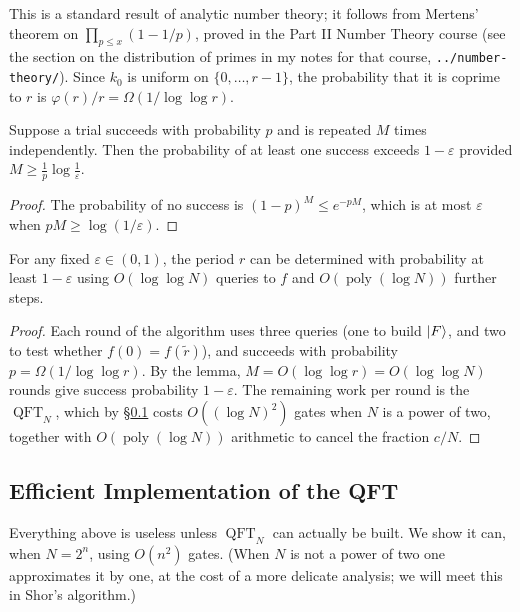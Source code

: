 \documentclass[a4paper]{scrartcl}
\newcommand{\QFT}{\operatorname{QFT}}
\DeclareMathOperator{\poly}{poly}
\begin{document}
This is a standard result of analytic number theory; it follows from Mertens' theorem on $\prod_{p\le x}(1-1/p)$, proved in the Part II Number Theory course (see the section on the distribution of primes in my notes for that course, \texttt{../number-theory/}). Since $k_0$ is uniform on $\{0,\dots,r-1\}$, the probability that it is coprime to $r$ is $\varphi(r)/r = \Omega(1/\log\log r)$.

\begin{lemma}
	Suppose a trial succeeds with probability $p$ and is repeated $M$ times independently. Then the probability of at least one success exceeds $1-\varepsilon$ provided $M\geq \frac{1}{p}\log\frac1\varepsilon$.
\end{lemma}

\begin{proof}
	The probability of no success is $(1-p)^M\leq e^{-pM}$, which is at most $\varepsilon$ when $pM\geq\log(1/\varepsilon)$.
\end{proof}

\begin{corollary}
	For any fixed $\varepsilon\in(0,1)$, the period $r$ can be determined with probability at least $1-\varepsilon$ using $O(\log\log N)$ queries to $f$ and $O(\poly(\log N))$ further steps.
\end{corollary}

\begin{proof}
	Each round of the algorithm uses three queries (one to build $\ket F$, and two to test whether $f(0) = f(\widetilde r)$), and succeeds with probability $p = \Omega(1/\log\log r)$. By the lemma, $M = O(\log\log r) = O(\log\log N)$ rounds give success probability $1-\varepsilon$. The remaining work per round is the $\QFT_N$, which by \S\ref{sec:qftimpl} costs $O((\log N)^2)$ gates when $N$ is a power of two, together with $O(\poly(\log N))$ arithmetic to cancel the fraction $c/N$.
\end{proof}

\subsection{Efficient Implementation of the QFT}\label{sec:qftimpl}

Everything above is useless unless $\QFT_N$ can actually be built. We show it can, when $N = 2^n$, using $O(n^2)$ gates. (When $N$ is not a power of two one approximates it by one, at the cost of a more delicate analysis; we will meet this in Shor's algorithm.)
\end{document}
